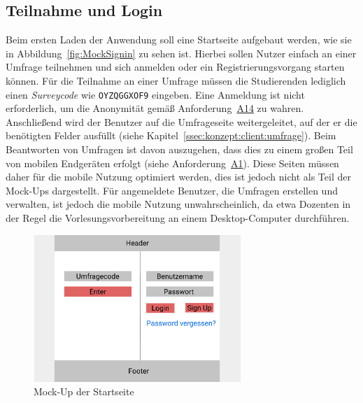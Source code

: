 \subsection{Teilnahme und Login}

Beim ersten Laden der Anwendung soll eine Startseite aufgebaut werden, wie sie in Abbildung~\vref{fig:MockSignin} zu sehen ist.
Hierbei sollen Nutzer einfach an einer Umfrage teilnehmen und sich anmelden oder ein Registrierungsvorgang starten können.
Für die Teilnahme an einer Umfrage müssen die Studierenden lediglich einen \emph{Surveycode} wie \zb \texttt{OYZQGGXOF9} eingeben.
Eine Anmeldung ist nicht erforderlich, um die Anonymität gemäß Anforderung~\hyperref[Anf:A14]{A14} zu wahren.
Anschließend wird der Benutzer auf die Umfrageseite weitergeleitet, auf der er die benötigten Felder ausfüllt (siehe Kapitel~\ref{ssec:konzept:client:umfrage}).
Beim Beantworten von Umfragen ist davon auszugehen, dass dies zu einem großen Teil von mobilen Endgeräten erfolgt (siehe Anforderung~\hyperref[Anf:A1]{A1}).
Diese Seiten müssen daher für die mobile Nutzung optimiert werden, dies ist jedoch nicht als Teil der Mock-Ups dargestellt.
Für angemeldete Benutzer, die Umfragen erstellen und verwalten, ist jedoch die mobile Nutzung unwahrscheinlich, da etwa Dozenten in der Regel die Vorlesungsvorbereitung an einem Desktop-Computer durchführen.

\begin{figure}[H]
	\centering
	\includegraphics[width=0.7\textwidth]{img/konzeption/client/signin}
	\captionsetup{justification=centering, format=plain}
	\caption[Mock-Up der Startseite]{Mock-Up der Startseite \\\figma}
	\label{fig:MockSignin}
\end{figure}

